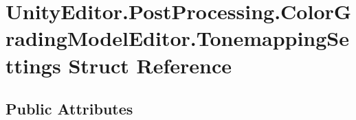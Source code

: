 \hypertarget{struct_unity_editor_1_1_post_processing_1_1_color_grading_model_editor_1_1_tonemapping_settings}{}\section{Unity\+Editor.\+Post\+Processing.\+Color\+Grading\+Model\+Editor.\+Tonemapping\+Settings Struct Reference}
\label{struct_unity_editor_1_1_post_processing_1_1_color_grading_model_editor_1_1_tonemapping_settings}
\subsection*{Public Attributes}
